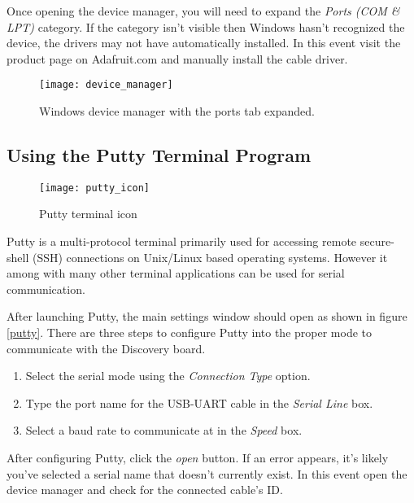 \documentclass[11pt,fleqn]{book} %
\begin{document}
Once opening the device manager, you will need to expand the \textit{Ports (COM \& LPT)} category. If the category isn't visible then Windows hasn't recognized the device, the drivers may not have automatically installed. In this event visit the product page on Adafruit.com and manually install the cable driver.  

\begin{figure}[]
    \centering\texttt{[image: device\_manager]}
    \caption{Windows device manager with the ports tab expanded.}
    \label{device_manager}
\end{figure}

\subsection{Using the Putty Terminal Program}


\begin{wrapfigure}[8]{h!R}{0.2\textwidth}
    \centering\texttt{[image: putty\_icon]}
    \caption{Putty terminal icon}
    \label{uvision_logo}
\end{wrapfigure}

Putty is a multi-protocol terminal primarily used for accessing remote secure-shell (SSH) connections on Unix/Linux based operating systems. However it among with many other terminal applications can be used for serial communication.

After launching Putty, the main settings window should open as shown in figure \ref{putty}. There are three steps to configure Putty into the proper mode to communicate with the Discovery board. 
\begin{enumerate}
    \item Select the serial mode using the \textit{Connection Type} option. 
    \item Type the port name for the USB-UART cable in the \textit{Serial Line} box.
    \item Select a baud rate to communicate at in the \textit{Speed} box.
\end{enumerate}

After configuring Putty, click the \textit{open} button. If an error appears, it's likely you've selected a serial name that doesn't currently exist. In this event open the device manager and check for the connected cable's ID. 
\end{document}
